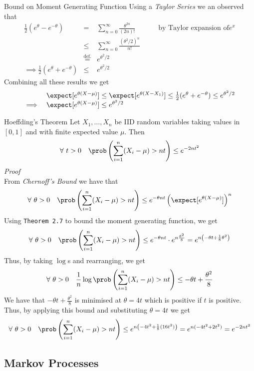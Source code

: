 \documentclass[11pt,a4paper]{article}
\begin{document}
\begin{theorem}{Bound on Moment Generating Function}
  Using a \textit{Taylor Series} we an observed that
  \[\begin{array}{rclll}
  \frac12(e^\theta-e^{-\theta})&=&{\displaystyle\sum_{n=0}^\infty}\frac{\theta^{2n}}{(2n)!}&\quad&\text{by Taylor expansion of}e^x\\
  &\leq&\displaystyle\sum_{n=0}^\infty\frac{(\theta^2/2)^n}{n!}\\
  &\overset{\text{def.}}{=}&e^{\theta^2/2}\\
  \implies\frac12(e^\theta+e^{-\theta})&\leq&e^{\theta^2/2}
  \end{array}\]
  Combining all these results we get
  \[ \begin{array}{rl}
  &\expect[e^{\theta(X-\mu)}]\leq\expect[e^{\theta(X-X_1)}]\leq\frac12(e^\theta+e^{-\theta})\leq e^{\theta^2/2}\\
  \implies&\expect[e^{\theta(X-\mu)}]\leq e^{\theta^2/2}
  \end{array}\]
  \proved
\end{theorem}

\begin{theorem}{Hoeffding's Theorem}
  Let $X_1,\dots,X_n$ be IID random variables taking values in $[0,1]$ and with finite expected value $\mu$. Then
  \[ \forall\ t>0\quad\prob\left(\sum_{i=1}^n(X_i-\mu)>nt\right)\leq e^{-2nt^2} \]
  \textit{Proof}\\
  From \textit{Chernoff's Bound} we have that
  \[ \forall\ \theta>0\quad\prob\left(\sum_{i=1}^n(X_i-\mu)>nt\right)\leq e^{-\theta nt}\left(\expect[e^{\theta(X-\mu)}]\right)^n \]
  Using \texttt{Theorem 2.7} to bound the moment generating function, we get
  \[ \forall\ \theta>0\quad\prob\left(\sum_{i=1}^n(X_i-\mu)>nt\right)\leq e^{-\theta nt}\cdot e^{n\frac{\theta^2}8}=e^{n\left(-\theta t+\frac{1}8\theta^2\right)} \]
  Thus, by taking $\log$s and rearranging, we get
  \[ \forall\ \theta>0\quad\frac1n\log\prob\left(\sum_{i=1}^n(X_i-\mu)>nt\right)\leq-\theta t+\frac{\theta^2}8 \]
  We have that $-\theta t+\frac{\theta^2}8$ is minimised at $\theta=4t$ which is positive if $t$ is positive. Thus, by applying this bound and substituting $\theta=4t$ we get
  \[ \forall\ \theta>0\quad\prob\left(\sum_{i=1}^n(X_i-\mu)>nt\right)\leq e^{n\left(-4t^2+\frac{1}8(16t^2)\right)}=e^{n(-4t^2+2t^2)}=e^{-2nt^2} \]
  \proved
\end{theorem}

\subsection{Markov Processes}
\end{document}
